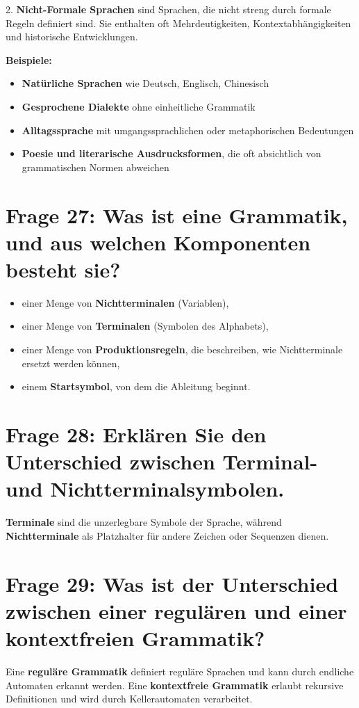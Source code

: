 \documentclass{article}
\begin{document}
2. \textbf{Nicht-Formale Sprachen} sind Sprachen, die nicht streng durch formale Regeln definiert sind. Sie enthalten oft Mehrdeutigkeiten, Kontextabhängigkeiten und historische Entwicklungen.

\textbf{Beispiele:}
\begin{itemize}
	\item \textbf{Natürliche Sprachen} wie Deutsch, Englisch, Chinesisch
	\item \textbf{Gesprochene Dialekte} ohne einheitliche Grammatik
	\item \textbf{Alltagssprache} mit umgangssprachlichen oder metaphorischen Bedeutungen
	\item \textbf{Poesie und literarische Ausdrucksformen}, die oft absichtlich von grammatischen Normen abweichen
\end{itemize}

\section*{Frage 27: Was ist eine Grammatik, und aus welchen Komponenten besteht sie?}
	\begin{itemize}
	\item einer Menge von \textbf{Nichtterminalen} (Variablen),
	\item einer Menge von \textbf{Terminalen} (Symbolen des Alphabets),
	\item einer Menge von \textbf{Produktionsregeln}, die beschreiben, wie Nichtterminale ersetzt werden können,
	\item einem \textbf{Startsymbol}, von dem die Ableitung beginnt.
\end{itemize}



	
\section*{Frage 28: Erklären Sie den Unterschied zwischen Terminal- und Nichtterminalsymbolen.}
\textbf{Terminale} sind die unzerlegbare Symbole der Sprache, während \textbf{Nichtterminale} als Platzhalter für andere Zeichen oder Sequenzen dienen.

\section*{Frage 29: Was ist der Unterschied zwischen einer regulären und einer kontextfreien Grammatik?}
Eine \textbf{reguläre Grammatik} definiert reguläre Sprachen und kann durch endliche Automaten erkannt werden. Eine \textbf{kontextfreie Grammatik} erlaubt rekursive Definitionen und wird durch Kellerautomaten verarbeitet.
\end{document}
